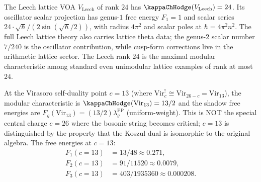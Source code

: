 \begin{remark}
The Leech lattice VOA $V_{\mathrm{Leech}}$ of rank $24$ has
$\kappaChHodge(V_{\mathrm{Leech}}) = 24$. Its oscillator scalar projection has genus-$1$ free
energy $F_1=1$ and scalar series
$24 \cdot \sqrt{\hbar}/(2\sin(\sqrt{\hbar}/2))$, with radius
$4\pi^2$ and scalar poles at $\hbar=4\pi^2 n^2$. The full Leech
lattice theory also carries lattice theta data; the genus-$2$ scalar
number $7/240$ is the oscillator contribution, while cusp-form
corrections live in the arithmetic lattice sector. The Leech rank
$24$ is the maximal modular characteristic among standard even
unimodular lattice examples of rank at most~$24$.
\end{remark}

\begin{remark}
At the Virasoro self-duality point $c = 13$ (where $\mathrm{Vir}_c^! \cong \mathrm{Vir}_{26-c} = \mathrm{Vir}_{13}$), the modular characteristic is $\kappaChHodge(\mathrm{Vir}_{13}) = 13/2$ and the shadow free energies are $F_g(\mathrm{Vir}_{13}) = (13/2)\lambda_g^{\mathrm{FP}}$ \textup{(}uniform-weight\textup{)}. This is NOT the special central charge $c = 26$ where the bosonic string becomes critical; $c = 13$ is distinguished by the property that the Koszul dual is isomorphic to the original algebra. The free energies at $c = 13$:
\begin{align*}
F_1(c=13) &= 13/48 \approx 0.271, \\
F_2(c=13) &= 91/11520 \approx 0.0079, \\
F_3(c=13) &= 403/1935360 \approx 0.000208.
\end{align*}
\end{remark}

